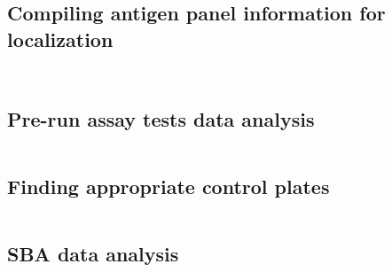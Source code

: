 \documentclass{article}
\begin{document}
\subsection{Compiling antigen panel information for localization}\label{panel_localize}
\inputminted[linenos=true, frame=topline, label=panel\_position\_input.R]{r}{code/panel_position_input.R}
\inputminted[linenos=true, frame=topline, label=panel\_sort\_output.R]{r}{code/panel_sort_output.R}

\subsection{Pre-run assay tests data analysis}\label{code_tests}
\inputminted[linenos=true, frame=topline, label=test\_analysis.R]{r}{code/test_analysis.R}

\subsection{Finding appropriate control plates}\label{code_control_wrangle}
\inputminted[linenos=true, frame=topline, label=MSC\_6\_wrangle.R]{r}{code/MSC_6_wrangle.R}

\subsection{SBA data analysis}\label{code_sba}
\inputminted[linenos=true, frame=topline, label=sba\_analysis.R]{r}{code/sba_analysis.R}
\inputminted[linenos=true, frame=topline, label=sba\_plot\_old.R]{r}{code/sba_plot_old.R}
\inputminted[linenos=true, frame=topline, label=sba\_plot\_results.R]{r}{code/sba_plot_results.R}


\end{document}
